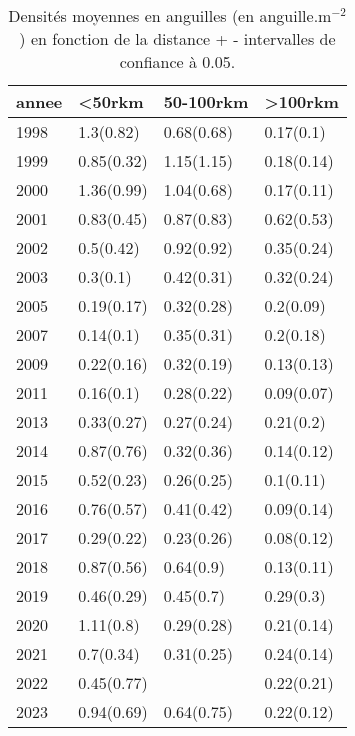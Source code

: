 \begin{table}[htbp]
\centering
\caption[Densité et distance.]{Densités moyennes en anguilles (en anguille.m$^{-2}$) en fonction de la distance + - intervalles de confiance à 0.05.} 
\label{tableau3_dens_dist_annee}
\begin{tabular}{llll}
  \hline
annee & <50rkm & 50-100rkm & >100rkm \\ 
  \hline
1998 & 1.3(0.82) & 0.68(0.68) & 0.17(0.1) \\ 
  1999 & 0.85(0.32) & 1.15(1.15) & 0.18(0.14) \\ 
  2000 & 1.36(0.99) & 1.04(0.68) & 0.17(0.11) \\ 
  2001 & 0.83(0.45) & 0.87(0.83) & 0.62(0.53) \\ 
  2002 & 0.5(0.42) & 0.92(0.92) & 0.35(0.24) \\ 
  2003 & 0.3(0.1) & 0.42(0.31) & 0.32(0.24) \\ 
  2005 & 0.19(0.17) & 0.32(0.28) & 0.2(0.09) \\ 
  2007 & 0.14(0.1) & 0.35(0.31) & 0.2(0.18) \\ 
  2009 & 0.22(0.16) & 0.32(0.19) & 0.13(0.13) \\ 
  2011 & 0.16(0.1) & 0.28(0.22) & 0.09(0.07) \\ 
  2013 & 0.33(0.27) & 0.27(0.24) & 0.21(0.2) \\ 
  2014 & 0.87(0.76) & 0.32(0.36) & 0.14(0.12) \\ 
  2015 & 0.52(0.23) & 0.26(0.25) & 0.1(0.11) \\ 
  2016 & 0.76(0.57) & 0.41(0.42) & 0.09(0.14) \\ 
  2017 & 0.29(0.22) & 0.23(0.26) & 0.08(0.12) \\ 
  2018 & 0.87(0.56) & 0.64(0.9) & 0.13(0.11) \\ 
  2019 & 0.46(0.29) & 0.45(0.7) & 0.29(0.3) \\ 
  2020 & 1.11(0.8) & 0.29(0.28) & 0.21(0.14) \\ 
  2021 & 0.7(0.34) & 0.31(0.25) & 0.24(0.14) \\ 
  2022 & 0.45(0.77) &  & 0.22(0.21) \\ 
  2023 & 0.94(0.69) & 0.64(0.75) & 0.22(0.12) \\ 
   \hline
\end{tabular}
\end{table}
